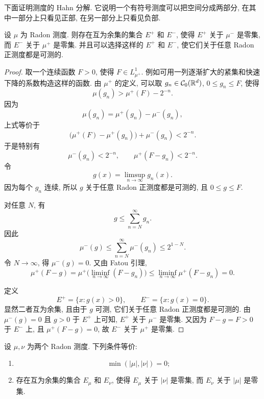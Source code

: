 下面证明测度的 Hahn 分解. 它说明一个有符号测度可以把空间分成两部分, 在其中一部分上只看见正部, 在另一部分上只看见负部.

\begin{thm}[Hahn 分解]
	\label{thm:hahn-decomposition-radon-measure}
	设 \(\mu\) 为 Radon 测度. 则存在互为余集的集合 \(E^+\) 和 \(E^-\), 使得 \(E^+\) 关于 \(\mu^-\) 是零集, 而 \(E^-\) 关于 \(\mu^+\) 是零集. 并且可以选择这样的 \(E^+\) 和 \(E^-\), 使它们关于任意 Radon 正测度都是可测的.
\end{thm}

\begin{proof}
	取一个连续函数 \(F>0\), 使得 \(F\in L^1_{\mu^+}\). 例如可用一列逐渐扩大的紧集和快速下降的系数构造这样的函数. 由 \(\mu^+\) 的定义, 可以取 \(g_n\in\mathcal{C}_0(\mathbb{R}^d)\), \(0\leq g_n\leq F\), 使得
	\[
	\mu(g_n)>\mu^+(F)-2^{-n}.
	\]
	因为
	\[
	\mu(g_n)=\mu^+(g_n)-\mu^-(g_n),
	\]
	上式等价于
	\[
	\bigl(\mu^+(F)-\mu^+(g_n)\bigr)+\mu^-(g_n)<2^{-n}.
	\]
	于是特别有
	\[
	\mu^-(g_n)<2^{-n},
	\qquad
	\mu^+(F-g_n)<2^{-n}.
	\]
	令
	\[
	g(x)=\limsup_{n\to\infty}g_n(x).
	\]
	因为每个 \(g_n\) 连续, 所以 \(g\) 关于任意 Radon 正测度都是可测的, 且 \(0\leq g\leq F\).
	
	对任意 \(N\), 有
	\[
	g\leq \sum_{n=N}^{\infty}g_n.
	\]
	因此
	\[
	\mu^-(g)
	\leq
	\sum_{n=N}^{\infty}\mu^-(g_n)
	\leq
	2^{1-N}.
	\]
	令 \(N\to\infty\), 得 \(\mu^-(g)=0\). 又由 Fatou 引理,
	\[
	\mu^+(F-g)
	=
	\mu^+\bigl(\liminf_{n\to\infty}(F-g_n)\bigr)
	\leq
	\liminf_{n\to\infty}\mu^+(F-g_n)=0.
	\]
	
	定义
	\[
	E^+=\{x:g(x)>0\},
	\qquad
	E^-=\{x:g(x)=0\}.
	\]
	显然二者互为余集, 且由于 \(g\) 可测, 它们关于任意 Radon 正测度都是可测的. 由 \(\mu^-(g)=0\) 且 \(g>0\) 于 \(E^+\) 上可知, \(E^+\) 关于 \(\mu^-\) 是零集. 又因为 \(F-g=F>0\) 于 \(E^-\) 上, 且 \(\mu^+(F-g)=0\), 故 \(E^-\) 关于 \(\mu^+\) 是零集.
\end{proof}

\begin{thm}
	\label{thm:singularity-equivalent-characterizations}
	设 \(\mu,\nu\) 为两个 Radon 测度. 下列条件等价:
	\begin{enumerate}
		\item
		\[
		\min(|\mu|,|\nu|)=0;
		\]
		\item 存在互为余集的集合 \(E_\mu\) 和 \(E_\nu\), 使得 \(E_\mu\) 关于 \(|\nu|\) 是零集, 而 \(E_\nu\) 关于 \(|\mu|\) 是零集.
	\end{enumerate}
\end{thm}

